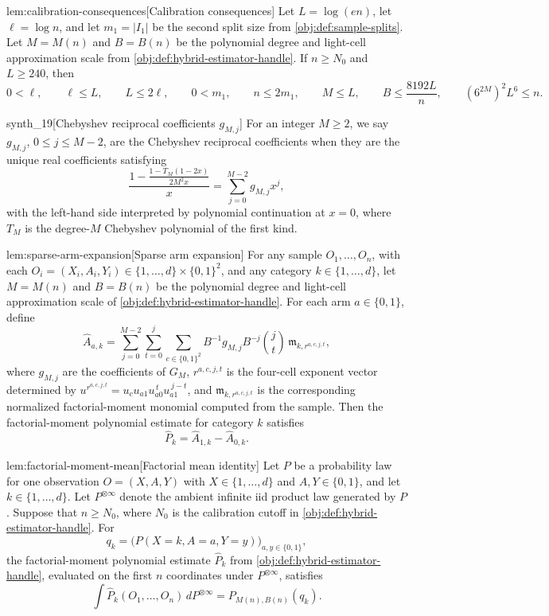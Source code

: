 \begin{lemmav}{lem:calibration-consequences}[Calibration consequences]
Let \(L=\log(en)\), let \(\ell=\log n\), and let \(m_1=|I_1|\) be the second split size from \cref{obj:def:sample-splits}. Let \(M=M(n)\) and \(B=B(n)\) be the polynomial degree and light-cell approximation scale from \cref{obj:def:hybrid-estimator-handle}. If \(n\ge N_0\) and \(L\ge240\), then
\[
0<\ell,\qquad
\ell\le L,\qquad
L\le2\ell,\qquad
0<m_1,\qquad
n\le2m_1,\qquad
M\le L,\qquad
B\le\frac{8192L}{n},\qquad
(6^{2M})^2L^6\le n .
\]
\end{lemmav}

\begin{definitionv}{synth_19}[Chebyshev reciprocal coefficients \(g_{M,j}\)]
For an integer \(M\ge2\), we say \(g_{M,j}\), \(0\le j\le M-2\), are the Chebyshev reciprocal coefficients when they are the unique real coefficients satisfying \[\frac{1-\frac{1-T_M(1-2x)}{2M^2x}}{x}=\sum_{j=0}^{M-2}g_{M,j}x^j,\] with the left-hand side interpreted by polynomial continuation at \(x=0\), where \(T_M\) is the degree-\(M\) Chebyshev polynomial of the first kind.
\end{definitionv}

\begin{lemmav}{lem:sparse-arm-expansion}[Sparse arm expansion]
For any sample \(O_1,\ldots,O_n\), with each \(O_i=(X_i,A_i,Y_i)\in\{1,\ldots,d\}\times\{0,1\}^2\), and any category \(k\in\{1,\ldots,d\}\), let \(M=M(n)\) and \(B=B(n)\) be the polynomial degree and light-cell approximation scale of \cref{obj:def:hybrid-estimator-handle}.  For each arm \(a\in\{0,1\}\), define
\[
\widehat A_{a,k}
=
\sum_{j=0}^{M-2}\sum_{t=0}^{j}\sum_{c\in\{0,1\}^2}
B^{-1} g_{M,j} B^{-j}\binom jt\,
\mathfrak m_{k,r^{a,c,j,t}},
\]
where \(g_{M,j}\) are the coefficients of \(G_M\), \(r^{a,c,j,t}\) is the four-cell exponent vector determined by
\(u^{r^{a,c,j,t}}=u_cu_{a1}u_{a0}^{\,t}u_{a1}^{\,j-t}\), and \(\mathfrak m_{k,r^{a,c,j,t}}\) is the corresponding normalized factorial-moment monomial computed from the sample.  Then the factorial-moment polynomial estimate for category \(k\) satisfies
\[
\widehat P_k=\widehat A_{1,k}-\widehat A_{0,k}.
\]
\end{lemmav}

\begin{lemmav}{lem:factorial-moment-mean}[Factorial mean identity]
Let \(P\) be a probability law for one observation \(O=(X,A,Y)\) with \(X\in\{1,\ldots,d\}\) and \(A,Y\in\{0,1\}\), and let \(k\in\{1,\ldots,d\}\). Let \(P^{\otimes\infty}\) denote the ambient infinite iid product law generated by \(P\). Suppose that \(n\ge N_0\), where \(N_0\) is the calibration cutoff in \cref{obj:def:hybrid-estimator-handle}. For
\[
q_k=\bigl(P(X=k,A=a,Y=y)\bigr)_{a,y\in\{0,1\}},
\]
the factorial-moment polynomial estimate \(\widehat P_k\) from \cref{obj:def:hybrid-estimator-handle}, evaluated on the first \(n\) coordinates under \(P^{\otimes\infty}\), satisfies
\[
\int \widehat P_k(O_1,\ldots,O_n)\,dP^{\otimes\infty}
=
P_{M(n),B(n)}(q_k).
\]
\end{lemmav}


